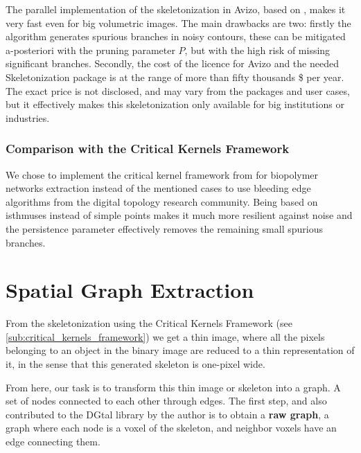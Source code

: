 
The parallel implementation of the skeletonization in Avizo, based on \cite{fouard_skeletonization_2004}, makes it very fast even for big volumetric images.
The main drawbacks are two: firstly the algorithm generates spurious branches in noisy contours,
these can be mitigated a-posteriori with the pruning parameter $P$, but with the high risk of missing significant branches.
Secondly, the cost of the licence for Avizo and the needed Skeletonization package is at the range of more than fifty thousands \$ per year. The exact price is not disclosed, and may vary from the packages and user cases, but it effectively makes this skeletonization only available for big institutions or industries.

\subsubsection{Comparison with the Critical Kernels Framework}%
\label{subsub:comparison}

We chose to implement the critical kernel framework from \citep{bertrand_powerful_2014} for biopolymer networks extraction instead of the mentioned cases to use bleeding edge algorithms from the digital topology research community. Being based on isthmuses instead of simple points makes it much more resilient against noise and the persistence parameter effectively removes the remaining small spurious branches.

\section{Spatial Graph Extraction}%
\label{sec:spatial_graph_extraction}

From the skeletonization using the Critical Kernels Framework (see \autoref{sub:critical_kernels_framework}) we get a thin image, where all the pixels belonging to an object in the binary image are reduced to a thin representation of it, in the sense that this generated skeleton is one-pixel wide.

From here, our task is to transform this thin image or skeleton into a \gls{graph}. A set of nodes connected to each other through edges. The first step, and also contributed to the DGtal library by the author is to obtain a \textbf{raw graph}, a graph where each node is a voxel of the skeleton, and neighbor voxels have an edge connecting them.

